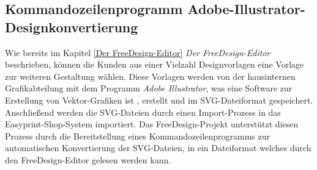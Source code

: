 \subsection{Kommandozeilenprogramm Adobe-Illustrator-Designkonvertierung}
\label{Kommandozeilenprogramm Adobe-Illustrator-Designkonvertierung}
Wie bereits im Kapitel \ref{Der FreeDesign-Editor} \emph{Der FreeDesign-Editor} beschrieben, können die Kunden aus einer Vielzahl Designvorlagen eine Vorlage zur weiteren Gestaltung wählen. 
Diese Vorlagen werden von der hausinternen Grafikabteilung mit dem Programm \emph{Adobe Illustrator}, was eine Software zur Erstellung von Vektor-Grafiken ist \autocite[vgl.][]{Adobe:Illustrator}, erstellt und im SVG-Dateiformat gespeichert. Anschließend werden die SVG-Dateien durch einen Import-Prozess in das Easyprint-Shop-System importiert. Das FreeDesign-Projekt unterstützt diesen Prozess durch die Bereitstellung eines Kommandozeilenprogramms zur automatischen Konvertierung der SVG-Dateien, in ein Dateiformat welches durch den FreeDesign-Editor gelesen werden kann.  

